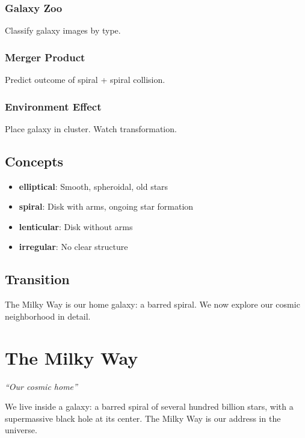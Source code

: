 \documentclass[
  11pt,
  letterpaper,
  twoside,
  openright]{book}
\providecommand{\tightlist}{%
  \setlength{\itemsep}{0pt}\setlength{\parskip}{0pt}}
\begin{document}
\subsection{Galaxy Zoo}\label{galaxy-zoo}

Classify galaxy images by type.

\subsection{Merger Product}\label{merger-product}

Predict outcome of spiral + spiral collision.

\subsection{Environment Effect}\label{environment-effect}

Place galaxy in cluster. Watch transformation.

\section{Concepts}\label{concepts-25}

\begin{itemize}
\tightlist
\item
  \textbf{elliptical}: Smooth, spheroidal, old stars
\item
  \textbf{spiral}: Disk with arms, ongoing star formation
\item
  \textbf{lenticular}: Disk without arms
\item
  \textbf{irregular}: No clear structure
\end{itemize}

\section{Transition}\label{transition-25}

The Milky Way is our home galaxy: a barred spiral. We now explore our
cosmic neighborhood in detail.

\chapter{The Milky Way}\label{sec-milky-way}

\emph{``Our cosmic home''}

\begin{tcolorbox}[enhanced jigsaw, coltitle=black, colbacktitle=quarto-callout-note-color!10!white, toprule=.15mm, colframe=quarto-callout-note-color-frame, arc=.35mm, opacityback=0, bottomtitle=1mm, toptitle=1mm, breakable, colback=white, titlerule=0mm, opacitybacktitle=0.6, title=\textcolor{quarto-callout-note-color}{\faInfo}\hspace{0.5em}{Key Revelation}, rightrule=.15mm, bottomrule=.15mm, leftrule=.75mm, left=2mm]

We live inside a galaxy: a barred spiral of several hundred billion
stars, with a supermassive black hole at its center. The Milky Way is
our address in the universe.

\end{tcolorbox}
\end{document}
